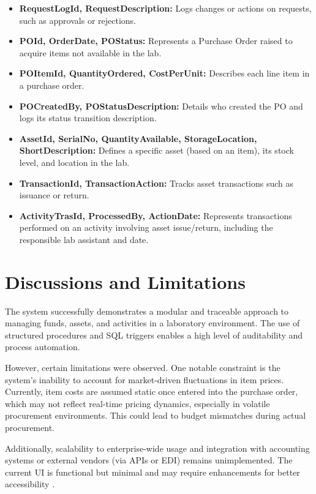 \documentclass[11pt]{article}
\begin{document}
\begin{itemize}
  \item \textbf{RequestLogId, RequestDescription:} Logs changes or actions on requests, such as approvals or rejections.
  
  \item \textbf{POId, OrderDate, POStatus:} Represents a Purchase Order raised to acquire items not available in the lab.
  
  \item \textbf{POItemId, QuantityOrdered, CostPerUnit:} Describes each line item in a purchase order.
  
  \item \textbf{POCreatedBy, POStatusDescription:} Details who created the PO and logs its status transition description.
  
  \item \textbf{AssetId, SerialNo, QuantityAvailable, StorageLocation, ShortDescription:} Defines a specific asset (based on an item), its stock level, and location in the lab.
  
  \item \textbf{TransactionId, TransactionAction:} Tracks asset transactions such as issuance or return.
  
  \item \textbf{ActivityTrasId, ProcessedBy, ActionDate:} Represents transactions performed on an activity involving asset issue/return, including the responsible lab assistant and date.
\end{itemize}
\section{Discussions and Limitations}

The system successfully demonstrates a modular and traceable approach to managing funds, assets, and activities in a laboratory environment. The use of structured procedures and SQL triggers enables a high level of auditability and process automation.

However, certain limitations were observed. One notable constraint is the system's inability to account for market-driven fluctuations in item prices. Currently, item costs are assumed static once entered into the purchase order, which may not reflect real-time pricing dynamics, especially in volatile procurement environments. This could lead to budget mismatches during actual procurement.

Additionally, scalability to enterprise-wide usage and integration with accounting systems or external vendors (via APIs or EDI) remains unimplemented. The current UI is functional but minimal and may require enhancements for better accessibility .
\end{document}
